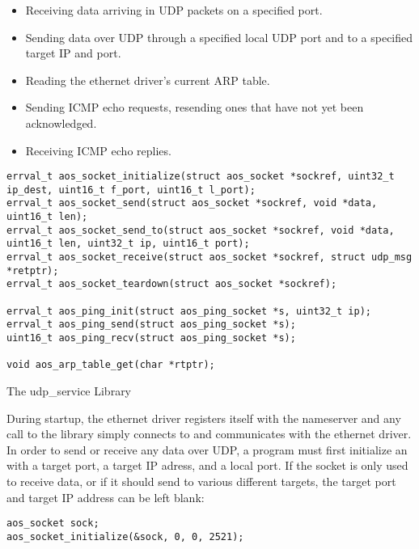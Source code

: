 \begin{itemize}
    \item Receiving data arriving in UDP packets on a specified port.
    \item Sending data over UDP through a specified local UDP port and to a specified target IP and port.
    \item Reading the ethernet driver's current ARP table.
    \item Sending ICMP echo requests, resending ones that have not yet been acknowledged.
    \item Receiving ICMP echo replies.
\end{itemize}

\begin{code}
\begin{mdframed}[style=myframe]
\begin{verbatim}
errval_t aos_socket_initialize(struct aos_socket *sockref, uint32_t ip_dest, uint16_t f_port, uint16_t l_port);
errval_t aos_socket_send(struct aos_socket *sockref, void *data, uint16_t len);
errval_t aos_socket_send_to(struct aos_socket *sockref, void *data, uint16_t len, uint32_t ip, uint16_t port);
errval_t aos_socket_receive(struct aos_socket *sockref, struct udp_msg *retptr);
errval_t aos_socket_teardown(struct aos_socket *sockref);

errval_t aos_ping_init(struct aos_ping_socket *s, uint32_t ip);
errval_t aos_ping_send(struct aos_ping_socket *s);
uint16_t aos_ping_recv(struct aos_ping_socket *s);

void aos_arp_table_get(char *rtptr);
\end{verbatim}
\end{mdframed}
\caption{The udp\_service Library}
\end{code}
\label{enet:udp_service}


During startup, the ethernet driver registers itself with the nameserver and any call to the  library simply connects to and communicates with the ethernet driver. In order to send or receive any data over UDP, a program must first initialize an  with a target port, a target IP adress, and a local port. If the socket is only used to receive data, or if it should send to various different targets, the target port and target IP address can be left blank:
\begin{mdframed}[style=myframe]
\begin{verbatim}
aos_socket sock;
aos_socket_initialize(&sock, 0, 0, 2521);
\end{verbatim}
\end{mdframed}


